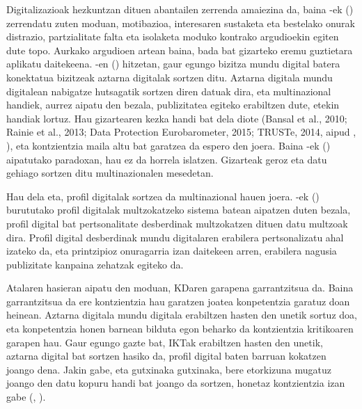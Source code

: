 Digitalizazioak hezkuntzan dituen abantailen zerrenda amaiezina da, baina \citeauthor{cobos2009}-ek (\citeyear{cobos2009}) zerrendatu zuten moduan, motibazioa, interesaren sustaketa eta bestelako onurak distrazio, partzialitate falta eta isolaketa moduko kontrako argudioekin egiten dute topo. Aurkako argudioen artean baina, bada bat gizarteko eremu guztietara aplikatu daitekeena. \citeauthor{vervier2017perceptions}-en (\citeyear{vervier2017perceptions}) hitzetan, gaur egungo bizitza mundu digital batera konektatua bizitzeak aztarna digitalak sortzen ditu. Aztarna digitala mundu digitalean nabigatze hutsagatik sortzen diren datuak dira, eta multinazional handiek, aurrez aipatu den bezala, publizitatea egiteko erabiltzen dute, etekin handiak lortuz. Hau gizartearen kezka handi bat dela diote (Bansal et al., 2010; Rainie et al., 2013; Data Protection Eurobarometer, 2015; TRUSTe, 2014, aipud \citeauthor{vervier2017perceptions}, \citeyear{vervier2017perceptions}), eta kontzientzia maila altu bat garatzea da espero den joera. Baina \citeauthor{norberg2007privacy}-ek (\citeyear{norberg2007privacy}) aipatutako paradoxan, hau ez da horrela islatzen. Gizarteak geroz eta datu gehiago sortzen ditu multinazionalen mesedetan.

Hau dela eta, profil digitalak sortzea da multinazional hauen joera. \citeauthor{azucar2018predicting}-ek (\citeyear{azucar2018predicting}) burututako profil digitalak multzokatzeko sistema batean aipatzen duten bezala, profil digital bat pertsonalitate desberdinak multzokatzen dituen datu multzoak dira. Profil digital desberdinak mundu digitalaren erabilera pertsonalizatu ahal izateko da, eta printzipioz onuragarria izan daitekeen arren, erabilera nagusia publizitate kanpaina zehatzak egiteko da.

Atalaren hasieran aipatu den moduan, KDaren garapena garrantzitsua da. Baina garrantzitsua da ere kontzientzia hau garatzen joatea konpetentzia garatuz doan heinean. Aztarna digitala mundu digitala erabiltzen hasten den unetik sortuz doa, eta konpetentzia honen barnean bilduta egon beharko da kontzientzia kritikoaren garapen hau. Gaur egungo gazte bat, IKTak erabiltzen hasten den unetik, aztarna digital bat sortzen hasiko da, profil digital baten barruan kokatzen joango dena. Jakin gabe, eta gutxinaka gutxinaka, bere etorkizuna mugatuz joango den datu kopuru handi bat joango da sortzen, honetaz kontzientzia izan gabe (\citeauthor{wook2019awareness}, \citeyear{wook2019awareness}).


